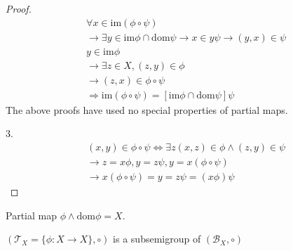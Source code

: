 \begin{Prop}
\begin{proof}
\begin{align*}
            &\forall x\in \mathrm{im}(\phi \circ \psi)  \\
            &\rightarrow \exists y \in \mathrm{im}\phi \cap \mathrm{dom}\psi \rightarrow x\in y\psi \rightarrow (y,x)\in \psi   \\
            &y \in \mathrm{im}\phi \\
            &\rightarrow \exists z \in X, (z,y) \in \phi    \\
            &\rightarrow (z,x)\in \phi \circ \psi \\
            &\Rightarrow \mathrm{im}(\phi \circ \psi)=[\mathrm{im}\phi \cap \mathrm{dom}\psi]\psi
        \end{align*}
        The above proofs have used no special properties of partial maps.

        3.
        \begin{align*}
            &(x,y)\in \phi \circ \psi \Leftrightarrow \exists z (x,z)\in \phi \wedge (z,y)\in \psi  \\
            &\rightarrow z=x\phi ,y=z\psi ,y=x(\phi \circ \psi) \\
            &\rightarrow x(\phi \circ \psi)=y=z\psi =(x\phi )\psi 
        \end{align*}
    \end{proof}
\end{Prop}

\begin{Def}
    Partial map $\phi \wedge \mathrm{dom}\phi =X$. 
\end{Def}

\begin{Prop}
    $(\mathcal{T}_X=\{\phi:X\rightarrow X\}, \circ )$ is a subsemigroup of $(\mathcal{B}_X,\circ )$ 
\end{Prop}

